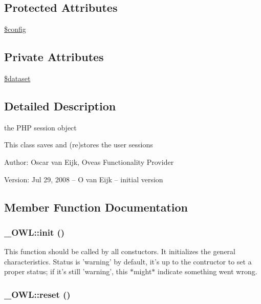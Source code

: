 \subsection*{Protected Attributes}
\begin{CompactItemize}
\item 
\hyperlink{class__OWL_f37a011667dda12fc417a68a6f3077d1}{\$config}
\end{CompactItemize}
\subsection*{Private Attributes}
\begin{CompactItemize}
\item 
\hyperlink{classSessionHandler_74c46fcfbadd4c4e6bacc73ddf350056}{\$dataset}
\end{CompactItemize}


\subsection{Detailed Description}
the PHP session object 

This class saves and (re)stores the user sessions \begin{Desc}
\item[Author:]Oscar van Eijk, Oveas Functionality Provider \end{Desc}
\begin{Desc}
\item[Version:]Jul 29, 2008 -- O van Eijk -- initial version \end{Desc}


\subsection{Member Function Documentation}
\hypertarget{class__OWL_e0ef3ded56e8a6b34b6461e5a721cd3e}{
\subsubsection{\setlength{\rightskip}{0pt plus 5cm}\_\-OWL::init ()}}
\label{class__OWL_e0ef3ded56e8a6b34b6461e5a721cd3e}


This function should be called by all constuctors. It initializes the general characteristics. Status is 'warning' by default, it's up to the contructor to set a proper status; if it's still 'warning', this $\ast$might$\ast$ indicate something went wrong. \hypertarget{class__OWL_2f2a042bcf31965194c03033df0edc9b}{
\subsubsection{\setlength{\rightskip}{0pt plus 5cm}\_\-OWL::reset ()}}
\label{class__OWL_2f2a042bcf31965194c03033df0edc9b}


